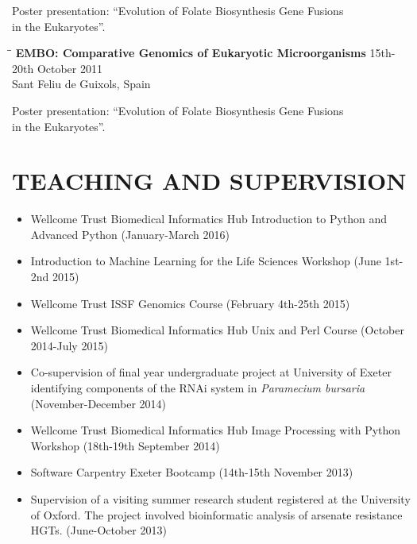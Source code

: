 \documentclass{res}
\begin{document}
\begin{resume}
\begin{tabbing}
   \end{tabbing}\vspace{-20pt}      
      Poster presentation: ``Evolution of Folate Biosynthesis Gene Fusions \\in the Eukaryotes''.
      
  
  \vspace{-0.1in}
     \begin{tabbing} 
   \hspace{2in}\= \hspace{2.6in}\= \kill 
    {\bf EMBO: Comparative Genomics of Eukaryotic Microorganisms}
    \>  \> 15th-20th October 2011\\
                         \>    \> Sant Feliu de Guixols, Spain
   \end{tabbing}\vspace{-20pt}      
      Poster presentation: ``Evolution of Folate Biosynthesis Gene Fusions \\in the Eukaryotes''.

  \section{TEACHING AND SUPERVISION}
  \begin{itemize}
          \vspace{-1pt}
      \item Wellcome Trust Biomedical Informatics Hub Introduction to Python and Advanced Python (January-March 2016)
      \item Introduction to Machine Learning for the Life Sciences Workshop (June 1st-2nd 2015)
      \item Wellcome Trust ISSF Genomics Course (February 4th-25th 2015)
      \item Wellcome Trust Biomedical Informatics Hub Unix and Perl Course (October 2014-July 2015)
      \item Co-supervision of final year undergraduate project at University of Exeter identifying components of the RNAi system in \textit{Paramecium bursaria} (November-December 2014)
      \item Wellcome Trust Biomedical Informatics Hub Image Processing with Python Workshop (18th-19th September 2014)
      \item Software Carpentry Exeter Bootcamp (14th-15th November 2013)
      \item Supervision of a visiting summer research student registered at the University of Oxford. The project involved bioinformatic analysis of arsenate resistance HGTs. (June-October 2013)
  \end{itemize}


\end{resume}
\end{document}
